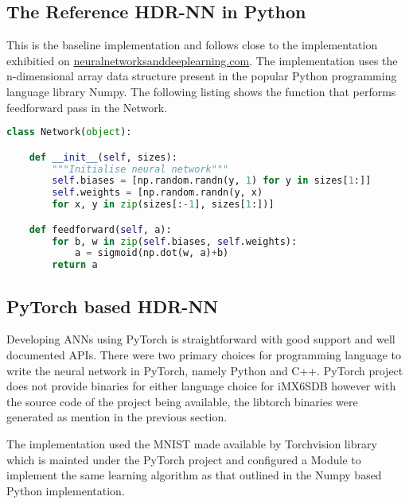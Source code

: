 \subsection{The Reference HDR-NN in Python}

This is the baseline implementation and follows close to the implementation exhibitied on \href{http://neuralnetworksanddeeplearning.com}{neuralnetworksanddeeplearning.com}. The implementation uses the n-dimensional array data structure present in the popular Python programming language library Numpy. The following listing shows the function that performs feedforward pass in the Network.

\begin{lstlisting}[language=Python]
	class Network(object):

	def __init__(self, sizes):
		"""Initialise neural network"""
		self.biases = [np.random.randn(y, 1) for y in sizes[1:]]
		self.weights = [np.random.randn(y, x)
		for x, y in zip(sizes[:-1], sizes[1:])]

	def feedforward(self, a):
		for b, w in zip(self.biases, self.weights):
			a = sigmoid(np.dot(w, a)+b)
		return a
\end{lstlisting}



\subsection{PyTorch based HDR-NN}

Developing ANNs using PyTorch is straightforward with good support and well documented APIs. There were two primary choices for programming language to write the neural network in PyTorch, namely Python and C++. PyTorch project does not provide binaries for either language choice for iMX6SDB however with the source code of the project being available, the libtorch binaries were generated as mention in the previous section.

The implementation used the MNIST made available by Torchvision library which is mainted under the PyTorch project and configured a Module to implement the same learning algorithm as that outlined in the Numpy based Python implementation.

